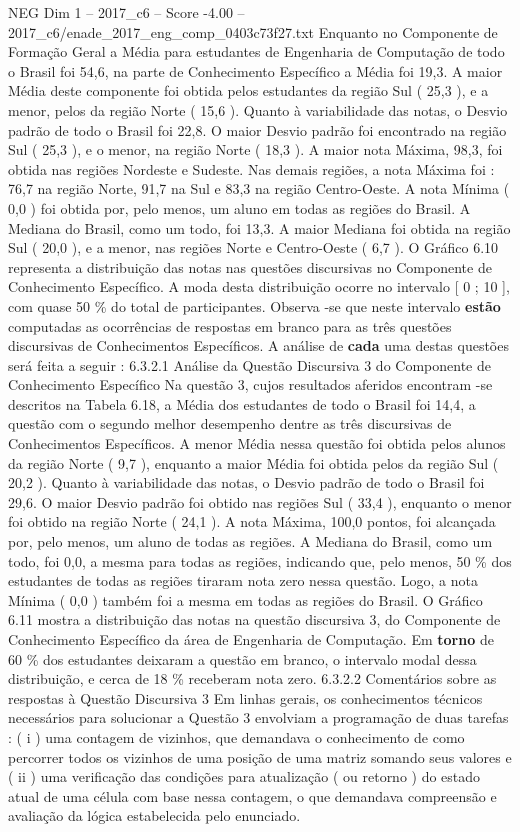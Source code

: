 \begin{textsample}{NEG Dim 1 – 2017\_c6 – Score -4.00 – 2017\_c6/enade\_2017\_eng\_comp\_0403c73f27.txt}
Enquanto no Componente de Formação Geral a Média para estudantes de Engenharia de Computação de todo o Brasil foi 54,6, na parte de Conhecimento Específico a Média foi 19,3.
A maior Média deste componente foi obtida pelos estudantes da região Sul ( 25,3 ), e a menor, pelos da região Norte ( 15,6 ).
Quanto à variabilidade das notas, o Desvio padrão de todo o Brasil foi 22,8.
O maior Desvio padrão foi encontrado na região Sul ( 25,3 ), e o menor, na região Norte ( 18,3 ).
A maior nota Máxima, 98,3, foi obtida nas regiões Nordeste e Sudeste.
Nas demais regiões, a nota Máxima foi : 76,7 na região Norte, 91,7 na Sul e 83,3 na região Centro-Oeste.
A nota Mínima ( 0,0 ) foi obtida por, pelo menos, um aluno em todas as regiões do Brasil.
A Mediana do Brasil, como um todo, foi 13,3.
A maior Mediana foi obtida na região Sul ( 20,0 ), e a menor, nas regiões Norte e Centro-Oeste ( 6,7 ).
O Gráfico 6.10 representa a distribuição das notas nas questões discursivas no Componente de Conhecimento Específico.
A moda desta distribuição ocorre no intervalo [ 0 ; 10 ], com quase 50 \% do total de participantes.
Observa -se que neste intervalo \textbf{estão} computadas as ocorrências de respostas em branco para as três questões discursivas de Conhecimentos Específicos.
A análise de \textbf{cada} uma destas questões será feita a seguir : 6.3.2.1 Análise da Questão Discursiva 3 do Componente de Conhecimento Específico Na questão 3, cujos resultados aferidos encontram -se descritos na Tabela 6.18, a Média dos estudantes de todo o Brasil foi 14,4, a questão com o segundo melhor desempenho dentre as três discursivas de Conhecimentos Específicos.
A menor Média nessa questão foi obtida pelos alunos da região Norte ( 9,7 ), enquanto a maior Média foi obtida pelos da região Sul ( 20,2 ).
Quanto à variabilidade das notas, o Desvio padrão de todo o Brasil foi 29,6.
O maior Desvio padrão foi obtido nas regiões Sul ( 33,4 ), enquanto o menor foi obtido na região Norte ( 24,1 ).
A nota Máxima, 100,0 pontos, foi alcançada por, pelo menos, um aluno de todas as regiões.
A Mediana do Brasil, como um todo, foi 0,0, a mesma para todas as regiões, indicando que, pelo menos, 50 \% dos estudantes de todas as regiões tiraram nota zero nessa questão.
Logo, a nota Mínima ( 0,0 ) também foi a mesma em todas as regiões do Brasil.
O Gráfico 6.11 mostra a distribuição das notas na questão discursiva 3, do Componente de Conhecimento Específico da área de Engenharia de Computação.
Em \textbf{torno} de 60 \% dos estudantes deixaram a questão em branco, o intervalo modal dessa distribuição, e cerca de 18 \% receberam nota zero. 6.3.2.2 Comentários sobre as respostas à Questão Discursiva 3 Em linhas gerais, os conhecimentos técnicos necessários para solucionar a Questão 3 envolviam a programação de duas tarefas : ( i ) uma contagem de vizinhos, que demandava o conhecimento de como percorrer todos os vizinhos de uma posição de uma matriz somando seus valores e ( ii ) uma verificação das condições para atualização ( ou retorno ) do estado atual de uma célula com base nessa contagem, o que demandava compreensão e avaliação da lógica estabelecida pelo enunciado.

\end{textsample}
